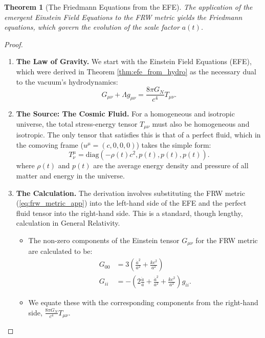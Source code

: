 \documentclass[11pt, letterpaper]{report}
\theoremstyle{plain} %
\newtheorem{theorem}{Theorem}[chapter]
\theoremstyle{definition} %
\theoremstyle{remark} %
\begin{document}
\begin{theorem}[The Friedmann Equations from the EFE]
The application of the emergent Einstein Field Equations to the FRW metric yields the Friedmann equations, which govern the evolution of the scale factor $a(t)$.
\end{theorem}
\begin{proof}
\begin{enumerate}
    \item \textbf{The Law of Gravity.} We start with the Einstein Field Equations (EFE), which were derived in Theorem \ref{thm:efe_from_hydro} as the necessary dual to the vacuum's hydrodynamics:
    \begin{equation}
        G_{\mu\nu} + \Lambda g_{\mu\nu} = \frac{8\pi G_N}{c^4} T_{\mu\nu}.
    \end{equation}

    \item \textbf{The Source: The Cosmic Fluid.} For a homogeneous and isotropic universe, the total stress-energy tensor $T_{\mu\nu}$ must also be homogeneous and isotropic. The only tensor that satisfies this is that of a perfect fluid, which in the comoving frame ($u^\mu = (c,0,0,0)$) takes the simple form:
    \begin{equation}
        T^\mu_\nu = \text{diag}(-\rho(t)c^2, p(t), p(t), p(t)).
    \end{equation}
    where $\rho(t)$ and $p(t)$ are the average energy density and pressure of all matter and energy in the universe.

    \item \textbf{The Calculation.} The derivation involves substituting the FRW metric (\cref{eq:frw_metric_app}) into the left-hand side of the EFE and the perfect fluid tensor into the right-hand side. This is a standard, though lengthy, calculation in General Relativity.
    \begin{itemize}
        \item The non-zero components of the Einstein tensor $G_{\mu\nu}$ for the FRW metric are calculated to be:
        \begin{align}
            G_{00} &= 3\left( \frac{\dot{a}^2}{a^2} + \frac{kc^2}{a^2} \right) \\
            G_{ii} &= -\left( 2\frac{\ddot{a}}{a} + \frac{\dot{a}^2}{a^2} + \frac{kc^2}{a^2} \right)g_{ii}.
        \end{align}
        \item We equate these with the corresponding components from the right-hand side, $ \frac{8\pi G_N}{c^4}T_{\mu\nu}$.
    \end{itemize}


\end{enumerate}
\end{proof}
\end{document}
